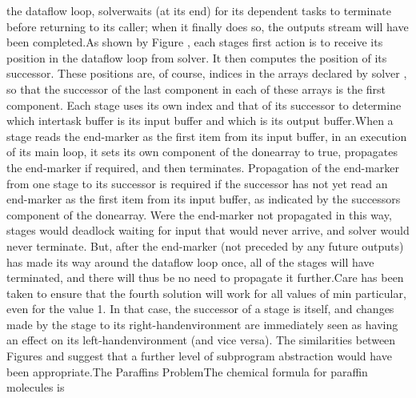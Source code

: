 the dataflow loop, \tyxffmxmono[]solver\tyxffmxendmono[] waits (at
its end) for its dependent tasks to terminate before returning to
its caller; when it finally does so, the \tyxffmxmono[]outputs%
\tyxffmxendmono[] stream will have been completed.\Endpara[]
\Para[]As shown by Figure , each
stage\rsquo[]s first action is to receive its position in
\TyPbrkNewp[]
 the dataflow loop from \tyxffmxmono[]solver\tyxffmxendmono[]. It
then computes the position of its successor. These positions are,
of course, indices in the arrays declared by \tyxffmxmono[]solver%
\tyxffmxendmono[], so that the successor of the last component in
each of these arrays is the first component. Each \tyxffmxmono[]stage%
\tyxffmxendmono[] uses its own index and that of its successor to
determine which intertask buffer is its input buffer and which is
its output buffer.\Endpara[]
\Para[]When a stage reads the end-marker as the first item from its
input buffer, in an execution of its main loop, it sets its own component
of the \tyxffmxmono[]done\tyxffmxendmono[] array to %
\tyxffmxmono[]true\tyxffmxendmono[], propagates the end-marker if
required, and then terminates. Propagation of the end-marker from
one stage to its successor is required if the successor has not yet
read an end-marker as the first item from \txtxemph[]its%
\txtxendemph[] input buffer, as indicated by the successor\rsquo[]s
component of the \tyxffmxmono[]done\tyxffmxendmono[] array. Were the
end-marker not propagated in this way, stages would deadlock waiting
for input that would never arrive, and \tyxffmxmono[]solver%
\tyxffmxendmono[] would never terminate. But, after the end-marker
(not preceded by any future outputs) has made its way around the dataflow
loop once, all of the stages will have terminated, and there will
thus be no need to propagate it further.\Endpara[]
\Para[]Care has been taken to ensure that the fourth solution will
work for all values of \tyxffmxmono[]m\tyxffmxendmono[]\EmDash[]in
particular, even for the value 1. In that case, the successor of a
stage is itself, and changes made by the stage to its \ldquo[]right-hand\rdquo[]
environment are immediately seen as having an effect on its \ldquo[]left-hand\rdquo[]
environment (and vice versa). The similarities between Figures %
 and 
suggest that a further level of subprogram abstraction would have
been appropriate.\Endpara[]
\DivEndiv[]
\DivEndiii[]
\DivLiii[]\HdMjLiii[]The Paraffins Problem\HdMjEndiii[]
\Para[]The chemical formula for paraffin molecules is \InlEqn[]\LmthEqn[]
